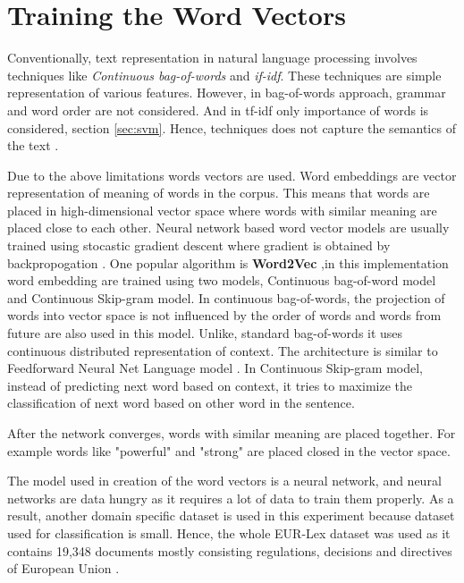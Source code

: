 \clearpage


\section{Training the Word Vectors}

Conventionally, text representation in natural language processing involves techniques like \textit{Continuous bag-of-words} and \textit{if-idf}. These techniques are simple representation of various features. However, in bag-of-words approach, grammar and word order are not considered. And in tf-idf only importance of words is considered, section \ref{sec:svm}. Hence, techniques does not capture the semantics of the text \cite{maas2011learning}.

Due to the above limitations words vectors are used. Word embeddings are vector representation of meaning of words in the corpus. This means that words are placed in high-dimensional vector space where words with similar meaning are placed close to each other. Neural network based word vector models are usually trained using stocastic gradient descent where gradient is obtained by backpropogation \cite{le2014distributed}. One popular algorithm is \textbf{Word2Vec} \cite{mikolov2013efficient},in this implementation word embedding are trained using two models, Continuous bag-of-word model and Continuous Skip-gram model. In continuous bag-of-words, the projection of words into vector space is not influenced by the order of words and words from future are also used in this model. Unlike, standard bag-of-words it uses continuous distributed representation of context. The architecture is similar to Feedforward Neural Net Language model \cite{bengio2003neural}. In Continuous Skip-gram model, instead of predicting next word based on context, it tries to maximize the classification of next word based on other word in the sentence.

After the network converges, words with similar meaning are placed together. For example words like "powerful" and "strong" are placed closed in the vector space. 

The model used in creation of the word vectors is a neural network, and neural networks are data hungry as it requires a lot of data to train them properly. As a result, another domain specific dataset is used in this experiment because dataset used for classification is small. Hence, the whole EUR-Lex dataset was used as it contains 19,348 documents mostly consisting regulations, decisions and directives of European Union \cite{jf:SemanticLaw}.

